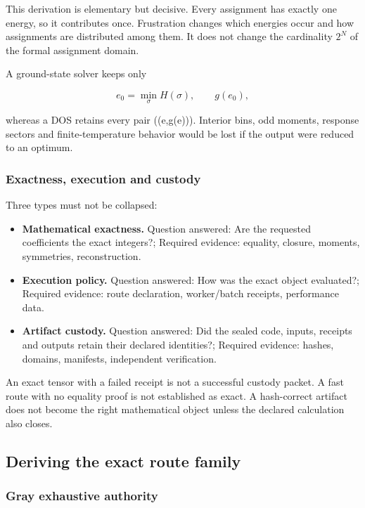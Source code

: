 This derivation is elementary but decisive. Every assignment has exactly
one energy, so it contributes once. Frustration changes which energies
occur and how assignments are distributed among them. It does not change
the cardinality \(2^N\) of the formal assignment domain.

A ground-state solver keeps only

\[
e_0=\min_\sigma H(\sigma),\qquad g(e_0),
\]

whereas a DOS retains every pair ((e,g(e))). Interior bins, odd moments,
response sectors and finite-temperature behavior would be lost if the
output were reduced to an optimum.

\subsubsection{Exactness, execution and
custody}\label{viii-ch03-exactness-execution-and-custody}

Three types must not be collapsed:

\begin{itemize}
\tightlist
\item
  \textbf{Mathematical exactness.} Question answered: Are the requested
  coefficients the exact integers?; Required evidence: equality,
  closure, moments, symmetries, reconstruction.
\item
  \textbf{Execution policy.} Question answered: How was the exact object
  evaluated?; Required evidence: route declaration, worker/batch
  receipts, performance data.
\item
  \textbf{Artifact custody.} Question answered: Did the sealed code,
  inputs, receipts and outputs retain their declared identities?;
  Required evidence: hashes, domains, manifests, independent
  verification.
\end{itemize}

An exact tensor with a failed receipt is not a successful custody
packet. A fast route with no equality proof is not established as exact.
A hash-correct artifact does not become the right mathematical object
unless the declared calculation also closes.

\subsection{Deriving the exact route
family}\label{viii-ch03-deriving-the-exact-route-family}

\subsubsection{Gray exhaustive
authority}\label{viii-ch03-gray-exhaustive-authority}

